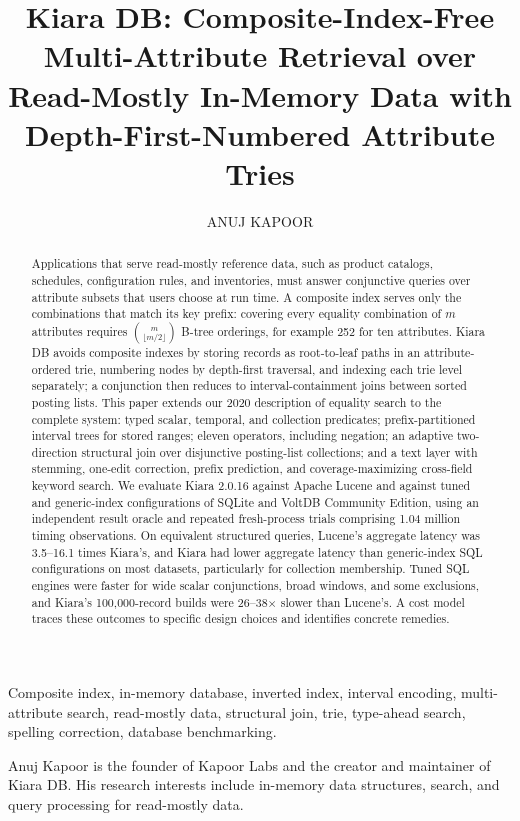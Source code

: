 \documentclass{ieeeaccess}\newif\ifaccess\accesstrue
\newcommand{\history}[1]{}
\newcommand{\doi}[1]{}
\newcommand{\tfootnote}[1]{}
\newcommand{\corresp}[1]{}
\newcommand{\EOD}{}
\newcommand{\PaperTitle}{Kiara DB: Composite-Index-Free Multi-Attribute Retrieval over Read-Mostly In-Memory Data with Depth-First-Numbered Attribute Tries}
\newcommand{\PaperAbstract}{%
Applications that serve read-mostly reference data, such as product catalogs, schedules, configuration rules, and inventories, must answer conjunctive queries over attribute subsets that users choose at run time. A composite index serves only the combinations that match its key prefix: covering every equality combination of $m$ attributes requires $\binom{m}{\lfloor m/2\rfloor}$ B-tree orderings, for example 252 for ten attributes. Kiara DB avoids composite indexes by storing records as root-to-leaf paths in an attribute-ordered trie, numbering nodes by depth-first traversal, and indexing each trie level separately; a conjunction then reduces to interval-containment joins between sorted posting lists. This paper extends our 2020 description of equality search to the complete system: typed scalar, temporal, and collection predicates; prefix-partitioned interval trees for stored ranges; eleven operators, including negation; an adaptive two-direction structural join over disjunctive posting-list collections; and a text layer with stemming, one-edit correction, prefix prediction, and coverage-maximizing cross-field keyword search. We evaluate Kiara 2.0.16 against Apache Lucene and against tuned and generic-index configurations of SQLite and VoltDB Community Edition, using an independent result oracle and repeated fresh-process trials comprising 1.04 million timing observations. On equivalent structured queries, Lucene's aggregate latency was 3.5--16.1 times Kiara's, and Kiara had lower aggregate latency than generic-index SQL configurations on most datasets, particularly for collection membership. Tuned SQL engines were faster for wide scalar conjunctions, broad windows, and some exclusions, and Kiara's 100{,}000-record builds were 26--38$\times$ slower than Lucene's. A cost model traces these outcomes to specific design choices and identifies concrete remedies.}
\newcommand{\PaperKeywords}{Composite index, in-memory database, inverted index, interval encoding, multi-attribute search, read-mostly data, structural join, trie, type-ahead search, spelling correction, database benchmarking.}
\begin{document}
\history{Date of publication xxxx 00, 0000, date of current version xxxx 00, 0000.}
\doi{10.1109/ACCESS.0000.DOI}

\title{\PaperTitle}

\ifaccess
  \author{\uppercase{Anuj Kapoor}}
  \address[1]{Kapoor Labs, USA (e-mail: anuj.kapoor@kapoorlabs.com)}
  \tfootnote{This work received no external funding.}
  \corresp{Corresponding author: Anuj Kapoor (e-mail: anuj.kapoor@kapoorlabs.com).}
  \begin{abstract}\PaperAbstract\end{abstract}
  \begin{keywords}\PaperKeywords\end{keywords}
  \titlepgskip=-21pt
  \maketitle
\else
  \author{Anuj~Kapoor%
    \thanks{A. Kapoor is with Kapoor Labs, USA (e-mail: anuj.kapoor@kapoorlabs.com).}%
    \thanks{This work received no external funding.}}
  \markboth{IEEE Access (manuscript in preparation)}{Kapoor: Composite-Index-Free Multi-Attribute Retrieval with Kiara DB}
  \maketitle
  \begin{abstract}\PaperAbstract\end{abstract}
  \begin{IEEEkeywords}\PaperKeywords\end{IEEEkeywords}
\fi













\begin{IEEEbiographynophoto}{Anuj Kapoor}
is the founder of Kapoor Labs and the creator and maintainer of Kiara DB. His research interests include in-memory data structures, search, and query processing for read-mostly data. %
\end{IEEEbiographynophoto}

\EOD
\end{document}
